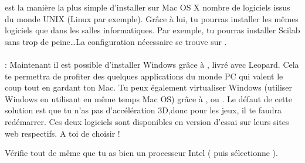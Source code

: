 



\noindent{} est la manière la plus simple d'installer sur Mac OS X nombre de logiciels issus du monde UNIX (Linux par exemple). Grâce à lui, tu pourras installer les mêmes logiciels que dans les salles informatiques. Par exemple, tu pourras installer Scilab sans trop de peine\dots La configuration nécessaire se trouve sur . \\ \\

\noindent {} : Maintenant il est possible d'installer Windows grâce à , livré avec Leopard. Cela te permettra de profiter des quelques applications du monde PC qui valent le coup tout en gardant ton Mac. Tu peux également virtualiser Windows (utiliser Windows en utilisant en même temps Mac OS) grâce à ,  ou . Le  défaut de cette solution est que tu n'as pas d'accélération 3D,donc pour les jeux, il te faudra redémarrer. Ces deux logiciels sont disponibles en version d'essai sur leurs sites web respectifs. A toi de choisir !

Vérifie tout de même que tu as bien un processeur Intel ( puis sélectionne ).
